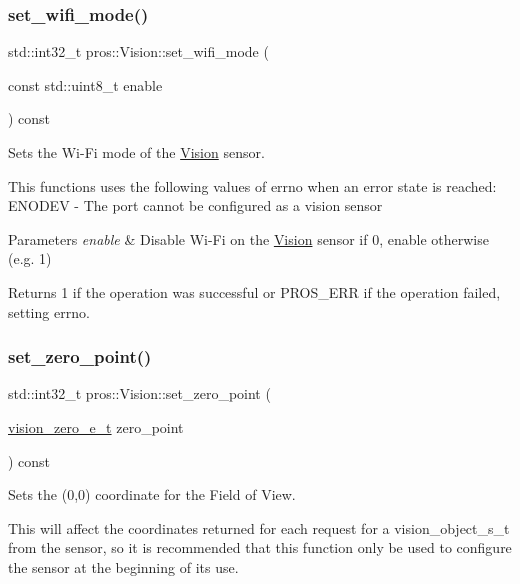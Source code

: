 \subsubsection{\texorpdfstring{set\+\_\+wifi\+\_\+mode()}{set\_wifi\_mode()}}
{\footnotesize\ttfamily std\+::int32\+\_\+t pros\+::\+Vision\+::set\+\_\+wifi\+\_\+mode (\begin{DoxyParamCaption}\item[{const std\+::uint8\+\_\+t}]{enable }\end{DoxyParamCaption}) const}



Sets the Wi-\/\+Fi mode of the \hyperlink{classpros_1_1Vision}{Vision} sensor. 

This functions uses the following values of errno when an error state is reached\+: E\+N\+O\+D\+EV -\/ The port cannot be configured as a vision sensor


\begin{DoxyParams}{Parameters}
{\em enable} & Disable Wi-\/\+Fi on the \hyperlink{classpros_1_1Vision}{Vision} sensor if 0, enable otherwise (e.\+g. 1)\\
\hline
\end{DoxyParams}
\begin{DoxyReturn}{Returns}
1 if the operation was successful or P\+R\+O\+S\+\_\+\+E\+RR if the operation failed, setting errno. 
\end{DoxyReturn}
\mbox{\label{classpros_1_1Vision_a89e0a23b112b8632171ef27cc6f57a6c}} 
\subsubsection{\texorpdfstring{set\+\_\+zero\+\_\+point()}{set\_zero\_point()}}
{\footnotesize\ttfamily std\+::int32\+\_\+t pros\+::\+Vision\+::set\+\_\+zero\+\_\+point (\begin{DoxyParamCaption}\item[{\hyperlink{vision_8h_a2e8bc1c48f8aab12275bfc1868fbbad6}{vision\+\_\+zero\+\_\+e\+\_\+t}}]{zero\+\_\+point }\end{DoxyParamCaption}) const}



Sets the (0,0) coordinate for the Field of View. 

This will affect the coordinates returned for each request for a vision\+\_\+object\+\_\+s\+\_\+t from the sensor, so it is recommended that this function only be used to configure the sensor at the beginning of its use.

